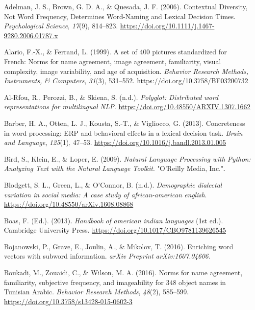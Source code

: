 \documentclass[
  english,
  man,floatsintext]{apa6}
\newlength{\cslhangindent}
\newenvironment{CSLReferences}[2] %
 {\begin{list}{}{%
  \setlength{\itemindent}{0pt}
  \setlength{\leftmargin}{0pt}
  \setlength{\parsep}{0pt}
  \ifodd #1
   \setlength{\leftmargin}{\cslhangindent}
   \setlength{\itemindent}{-1\cslhangindent}
  \fi
  \setlength{\itemsep}{#2\baselineskip}}}
 {\end{list}}
\begin{document}
\label{refs}
\begin{CSLReferences}{1}{0}
Adelman, J. S., Brown, G. D. A., \& Quesada, J. F. (2006). Contextual Diversity, Not Word Frequency, Determines Word-Naming and Lexical Decision Times. \emph{Psychological Science}, \emph{17}(9), 814--823. \url{https://doi.org/10.1111/j.1467-9280.2006.01787.x}

Alario, F.-X., \& Ferrand, L. (1999). A set of 400 pictures standardized for French: Norms for name agreement, image agreement, familiarity, visual complexity, image variability, and age of acquisition. \emph{Behavior Research Methods, Instruments, \& Computers}, \emph{31}(3), 531--552. \url{https://doi.org/10.3758/BF03200732}

Al-Rfou, R., Perozzi, B., \& Skiena, S. (n.d.). \emph{Polyglot: Distributed word representations for multilingual NLP}. \url{https://doi.org/10.48550/ARXIV.1307.1662}

Barber, H. A., Otten, L. J., Kousta, S.-T., \& Vigliocco, G. (2013). Concreteness in word processing: ERP and behavioral effects in a lexical decision task. \emph{Brain and Language}, \emph{125}(1), 47--53. \url{https://doi.org/10.1016/j.bandl.2013.01.005}

Bird, S., Klein, E., \& Loper, E. (2009). \emph{Natural Language Processing with Python: Analyzing Text with the Natural Language Toolkit}. {"}O'Reilly Media, Inc.{"}.

Blodgett, S. L., Green, L., \& O'Connor, B. (n.d.). \emph{Demographic dialectal variation in social media: A case study of african-american english}. \url{https://doi.org/10.48550/arXiv.1608.08868}

Boas, F. (Ed.). (2013). \emph{Handbook of american indian languages} (1st ed.). Cambridge University Press. \url{https://doi.org/10.1017/CBO9781139626545}

Bojanowski, P., Grave, E., Joulin, A., \& Mikolov, T. (2016). Enriching word vectors with subword information. \emph{arXiv Preprint arXiv:1607.04606}.

Boukadi, M., Zouaidi, C., \& Wilson, M. A. (2016). Norms for name agreement, familiarity, subjective frequency, and imageability for 348 object names in Tunisian Arabic. \emph{Behavior Research Methods}, \emph{48}(2), 585--599. \url{https://doi.org/10.3758/s13428-015-0602-3}


\end{CSLReferences}
\end{document}
